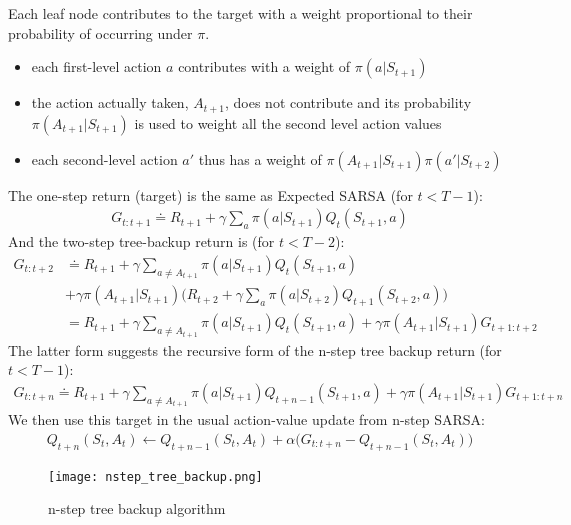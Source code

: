 \documentclass[sutton_barto_notes.tex]{subfiles}
\begin{document}
Each leaf node contributes to the target with a weight proportional to their probability of occurring under $\pi$.
\begin{itemize}
\item each first-level action $a$ contributes with a weight of $\pi(a|S_{t+1})$
\item the action actually taken, $A_{t+1}$, does not contribute and its probability $\pi(A_{t+1} | S_{t+1})$ is used to weight all the second level action values
\item each second-level action $a'$ thus has a weight of $\pi(A_{t+1} | S_{t+1}) \pi (a' | S_{t+2})$
\end{itemize}
The one-step return (target) is the same as Expected SARSA (for $t < T - 1$):
\begin{align*}
G_{t:t+1} \doteq R_{t+1} + \gamma \sum_a \pi(a| S_{t+1}) Q_t(S_{t+1}, a) \label{eq:7.14}\tag{7.14}
\end{align*}
And the two-step tree-backup return is (for $t < T - 2$):
\begin{equation} \label{eq4}
\begin{split}
G_{t:t+2} & \doteq R_{t+1} + \gamma \sum_{a \neq A_{t+1}} \pi(a| S_{t+1}) Q_t(S_{t+1}, a) \\
& + \gamma \pi(A_{t+1}|S_{t+1}) \big(R_{t+2} + \gamma \sum_a \pi(a|S_{t+2}) Q_{t+1}(S_{t+2}, a)\big)\\
 & = R_{t+1} + \gamma \sum_{a \neq A_{t+1}} \pi(a| S_{t+1}) Q_t(S_{t+1}, a) + \gamma \pi(A_{t+1}|S_{t+1}) G_{t+1:t+2}
\end{split}
\end{equation}
The latter form suggests the recursive form of the n-step tree backup return (for $t < T - 1$):
\begin{align}
G_{t:t+n} \doteq R_{t+1} + \gamma \sum_{a \neq A_{t+1}} \pi(a| S_{t+1}) Q_{t+n-1}(S_{t+1}, a) + \gamma \pi(A_{t+1}|S_{t+1}) G_{t+1:t+n} \label{eq:7.15}\tag{7.15}
\end{align}
We then use this target in the usual action-value update from n-step SARSA:
\begin{align}
Q_{t+n}(S_t, A_t) \gets Q_{t+n-1}(S_t, A_t)  + \alpha \big(G_{t:t+n} - Q_{t+n-1}(S_t, A_t)\big) \label{eq:7.16}\tag{7.16}
\end{align}

\begin{figure}[h!]
    \centering
     \texttt{[image: nstep\_tree\_backup.png]}
    \caption{ n-step tree backup algorithm }
\end{figure}
\end{document}
